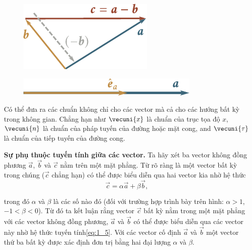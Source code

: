 \begin{figure}[!htb]
	\begin{minipage}[t]{0.5\linewidth}
		\begin{center}
			\includegraphics[scale=0.9]{figures/ch_01/fig_1_7.pdf}
			\caption[]{}
			\label{fig:1_7}
		\end{center}
	\end{minipage}
	\hfill{ }%
	\begin{minipage}[t]{0.5\linewidth}
		\begin{center}
			\includegraphics[scale=0.95]{figures/ch_01/fig_1_8.pdf}
			\caption[]{}
			\label{fig:1_8}
		\end{center}
	\end{minipage}
\end{figure}

Có thể đưa ra các chuẩn không chỉ cho các vector mà cả cho các hướng bất kỳ trong không gian. Chẳng hạn như $\vecuni{x}$ là chuẩn của trục tọa độ $x$, $\vecuni{n}$ là chuẩn của pháp tuyến của đường hoặc mặt cong, and $\vecuni{\tau}$ là chuẩn của tiếp tuyến của đường cong.

\textbf{Sự phụ thuộc tuyến tính giữa các vector.} Ta hãy xét ba vector không đồng phương $\vec{a}$, $\vec{b}$ và $\vec{c}$ nằm trên một mặt phẳng. Từ  rõ ràng là một vector bất kỳ trong chúng ($\vec{c}$ chẳng hạn) có thể được biểu diễn qua hai vector kia nhờ hệ thức
\begin{equation}\label{eq:1_5}
\vec{c} = \alpha\vec{a} + \beta\vec{b},
\end{equation}

\noindent
trong đó $\alpha$ và $\beta$ là các số nào đó (đối với trường hợp trình bày trên hình: $\alpha>1$, $-1<\beta<0$). Từ đó ta kết luận rằng vector $\vec{c}$ bất kỳ nằm trong một mặt phẳng với các vector không đồng phương, $\vec{a}$ và $\vec{b}$ có thể được biểu diễn qua các vector này nhờ hệ thức tuyến tính\eqref{eq:1_5}. Với các vector cố định $\vec{a}$ và $\vec{b}$ một vector thứ ba bất kỳ được xác định đơn trị bằng hai đại lượng $\alpha$ và $\beta$.

